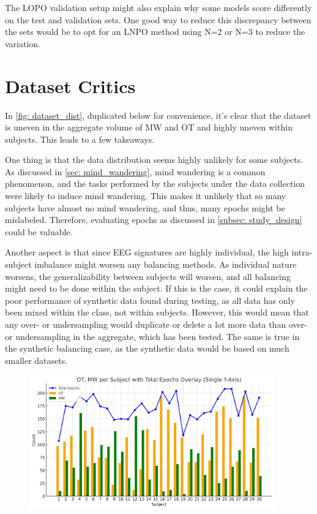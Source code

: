 The LOPO validation setup might also explain why some models score differently on the test and validation sets. One good way to reduce this discrepancy between the sets would be to opt for an LNPO method using N=2 or N=3 to reduce the variation.

\section{Dataset Critics}
In \autoref{fig: dataset_dist}, duplicated below for convenience, it's clear that the dataset is uneven in the aggregate volume of MW and OT and highly uneven within subjects. This leads to a few takeaways. 

One thing is that the data distribution seems highly unlikely for some subjects. As discussed in \autoref{sec: mind_wandering}, mind wandering is a common phenomenon, and the tasks performed by the subjects under the data collection were likely to induce mind wandering. This makes it unlikely that so many subjects have almost no mind wandering, and thus, many epochs might be mislabeled. Therefore, evaluating epochs as discussed in \autoref{subsec: study_design} could be valuable.

Another aspect is that since EEG signatures are highly individual, the high intra-subject imbalance might worsen any balancing methods. As individual nature worsens, the generalizability between subjects will worsen, and all balancing might need to be done within the subject. If this is the case, it could explain the poor performance of synthetic data found during testing, as all data has only been mixed within the class, not within subjects. However, this would mean that any over- or undersampling would duplicate or delete a lot more data than over- or undersampling in the aggregate, which has been tested. The same is true in the synthetic balancing case, as the synthetic data would be based on much smaller datasets. 
\begin{figure}[H]
    \centering
    \includegraphics[width=400px]{Figures/dataset_dist.png}
\end{figure}
